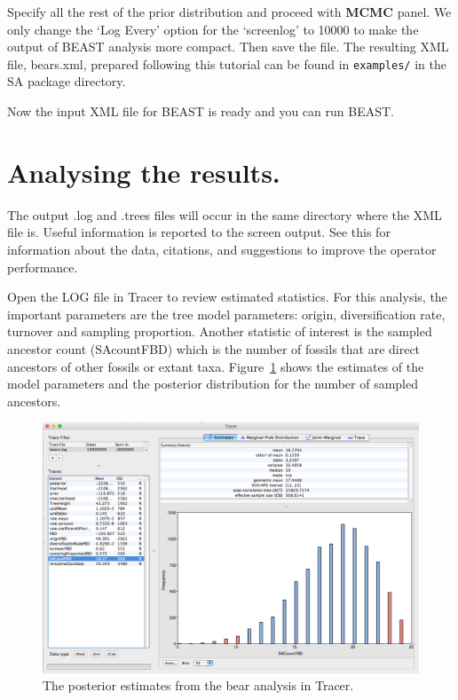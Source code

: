 \documentclass[12pt]{article}
\begin{document}
Specify all the rest of the prior distribution and proceed with {\bf MCMC} panel. We only change the `Log Every' option for the `screenlog' to 10000 to make the output of BEAST analysis more compact. Then save the file. The resulting XML file, bears.xml, prepared following this tutorial can be found in {\tt examples/} in the SA package directory. 

Now the input XML file for BEAST is ready and you can run BEAST. 

\section{Analysing the results.} 

The output .log and .trees files will occur in the same directory where the XML file is. Useful information is reported to the screen output. See this for information about the data, citations, and suggestions to improve the operator performance.  

Open the LOG file in Tracer to review estimated statistics. For this analysis, the important parameters are the tree model parameters: origin, diversification rate, turnover and sampling proportion. Another statistic of interest is the sampled ancestor count (SAcountFBD) which is the number of fossils that are direct ancestors of other fossils or extant taxa. Figure~\ref{fig:TracerOutput} shows the estimates of the model parameters and the posterior distribution for the number of sampled ancestors. 

\begin{figure}	
\centering
\includegraphics[width=\textwidth]{figures/TracerOutput}
\caption{The posterior estimates from the bear analysis in Tracer. \label{fig:TracerOutput}}
\end{figure}
\end{document}
